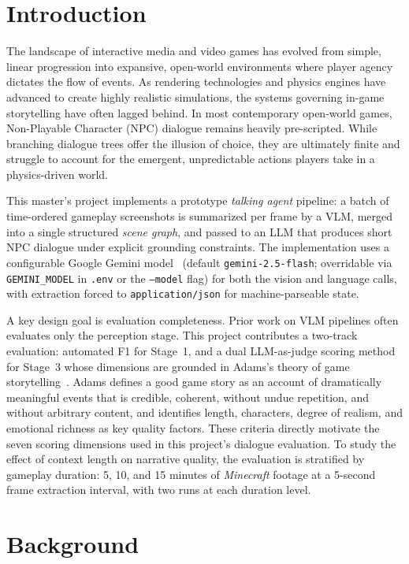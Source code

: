 \documentclass[11pt]{article}
\begin{document}
\section{Introduction}

The landscape of interactive media and video games has evolved from simple, linear progression into expansive, open-world environments where player agency dictates the flow of events. As rendering technologies and physics engines have advanced to create highly realistic simulations, the systems governing in-game storytelling have often lagged behind. In most contemporary open-world games, Non-Playable Character (NPC) dialogue remains heavily pre-scripted. While branching dialogue trees offer the illusion of choice, they are ultimately finite and struggle to account for the emergent, unpredictable actions players take in a physics-driven world.

This master's project implements a prototype \emph{talking agent} pipeline: a batch of time-ordered gameplay screenshots is summarized per frame by a VLM, merged into a single structured \emph{scene graph}, and passed to an LLM that produces short NPC dialogue under explicit grounding constraints. The implementation uses a configurable Google Gemini model~\cite{GeminiTeam2024b} (default \texttt{gemini-2.5-flash}; overridable via \texttt{GEMINI\_MODEL} in \texttt{.env} or the \texttt{--model} flag) for both the vision and language calls, with extraction forced to \texttt{application/json} for machine-parseable state.

A key design goal is evaluation completeness. Prior work on VLM pipelines often evaluates only the perception stage. This project contributes a two-track evaluation: automated F1 for Stage~1, and a dual LLM-as-judge scoring method~\cite{Zheng2023} for Stage~3 whose dimensions are grounded in Adams's theory of game storytelling~\cite{Adams2014}. Adams defines a good game story as an account of dramatically meaningful events that is credible, coherent, without undue repetition, and without arbitrary content, and identifies length, characters, degree of realism, and emotional richness as key quality factors. These criteria directly motivate the seven scoring dimensions used in this project's dialogue evaluation. To study the effect of context length on narrative quality, the evaluation is stratified by gameplay duration: 5, 10, and 15 minutes of \emph{Minecraft} footage at a 5-second frame extraction interval, with two runs at each duration level.

\section{Background}
\end{document}
